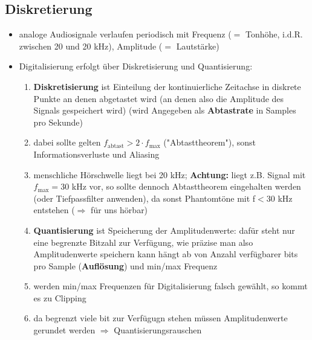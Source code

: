 \documentclass[12pt,landscape]{article}
\begin{document}
\begin{multicols}{3}
\subsection{Diskretierung}
\begin{itemize}
\item analoge Audiosignale verlaufen periodisch mit Frequenz ($=$ Tonhöhe, i.d.R. zwischen 20 und 20 kHz), Amplitude ($=$ Lautstärke)
\item Digitalisierung erfolgt über Diskretisierung und Quantisierung:
\begin{enumerate} \item \textbf{Diskretisierung} ist Einteilung der kontinuierliche Zeitachse in diskrete Punkte an denen abgetastet wird (an denen also die Amplitude des Signals gespeichert wird) (wird Angegeben als \textbf{Abtastrate} in Samples pro Sekunde)
\item dabei sollte gelten $f_{\text{abtast}}>2\cdot f_{\text{max}}$ ("Abtasttheorem"), sonst Informationsverluste und Aliasing
\item menschliche Hörschwelle liegt bei 20 kHz; \textbf{Achtung:} liegt z.B. Signal mit $f_{\text{max}}=30$ kHz vor, so sollte dennoch Abtasttheorem eingehalten werden (oder Tiefpassfilter anwenden), da sonst Phantomtöne mit f$<$30 kHz entstehen ($\Rightarrow$ für uns hörbar)
\item \textbf{Quantisierung} ist Speicherung der Amplitudenwerte: dafür steht nur eine begrenzte Bitzahl zur Verfügung, wie präzise man also Amplitudenwerte speichern kann hängt ab von Anzahl verfügbarer bits pro Sample (\textbf{Auflösung}) und min/max Frequenz
\item werden min/max Frequenzen für Digitalisierung falsch gewählt, so kommt es zu Clipping
\item da begrenzt viele bit zur Verfügugn stehen müssen Amplitudenwerte gerundet werden $\Rightarrow$ Quantisierungsrauschen
\end{enumerate}
\end{itemize}

\end{multicols}
\end{document}
